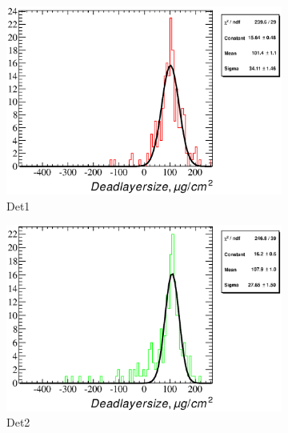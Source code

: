 \documentclass[a4paper,12pt]{article}
\begin{document}
\begin{figure}
\begin{subfigure}[b]{0.325\textwidth}
\includegraphics[width=\textwidth]{gfx/run13_alpha_study_novoltagevariation/B2D/c_hDeadLayerSize_by_run_distribution1_B2D.eps}
\caption{Det1}
\end{subfigure}
\hfill
\begin{subfigure}[b]{0.325\textwidth}
\includegraphics[width=\textwidth]{gfx/run13_alpha_study_novoltagevariation/B2D/c_hDeadLayerSize_by_run_distribution2_B2D.eps}
\caption{Det2}
\end{subfigure}
\hfill
\begin{subfigure}[b]{0.325\textwidth}

\end{subfigure}
\end{figure}
\end{document}
